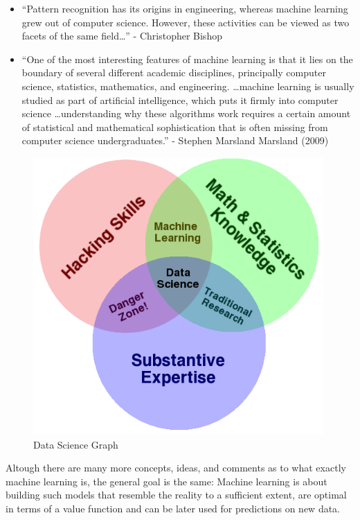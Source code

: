 \documentclass[]{article}
\providecommand{\tightlist}{%
  \setlength{\itemsep}{0pt}\setlength{\parskip}{0pt}}
\begin{document}
\begin{itemize}
\tightlist
\item
  ``Pattern recognition has its origins in engineering, whereas machine
  learning grew out of computer science. However, these activities can
  be viewed as two facets of the same field\ldots{}'' - Christopher
  Bishop
\item
  ``One of the most interesting features of machine learning is that it
  lies on the boundary of several different academic disciplines,
  principally computer science, statistics, mathematics, and
  engineering. \ldots{}machine learning is usually studied as part of
  artificial intelligence, which puts it firmly into computer science
  \ldots{}understanding why these algorithms work requires a certain
  amount of statistical and mathematical sophistication that is often
  missing from computer science undergraduates.'' - Stephen Marsland
  Marsland (2009)
\end{itemize}

\begin{figure}
\centering
\includegraphics[height=4.16667in]{../img/data_science.png}
\caption{Data Science Graph}
\end{figure}

Altough there are many more concepts, ideas, and comments as to what
exactly machine learning is, the general goal is the same: Machine
learning is about building such models that resemble the reality to a
sufficient extent, are optimal in terms of a value function and can be
later used for predictions on new data.
\end{document}
